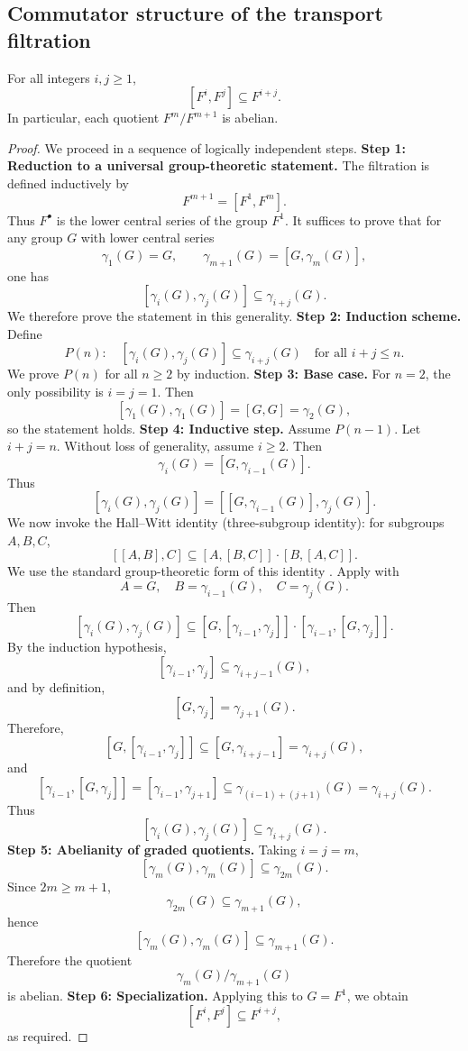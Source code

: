 \subsection*{Commutator structure of the transport filtration}
\begin{lemma}
	\label{lem:fusion-commutator}
	For all integers \(i,j\ge 1\),
	\[
		[F^i,F^j]\subseteq F^{i+j}.
	\]
	In particular, each quotient \(F^m/F^{m+1}\) is abelian.
\end{lemma}
\begin{proof}
	We proceed in a sequence of logically independent steps.
	\medskip
	\noindent
	\textbf{Step 1: Reduction to a universal group-theoretic statement.}
	The filtration is defined inductively by
	\[
		F^{m+1}=[F^1,F^m].
	\]
	Thus \(F^\bullet\) is the lower central series of the group \(F^1\).
	It suffices to prove that for any group \(G\) with lower central series
	\[
		\gamma_1(G)=G,\qquad \gamma_{m+1}(G)=[G,\gamma_m(G)],
	\]
	one has
	\[
		[\gamma_i(G),\gamma_j(G)]\subseteq \gamma_{i+j}(G).
	\]
	We therefore prove the statement in this generality.
	\medskip
	\noindent
	\textbf{Step 2: Induction scheme.}
	Define
	\[
		P(n):\quad
		[\gamma_i(G),\gamma_j(G)]\subseteq \gamma_{i+j}(G)
		\quad\text{for all }i+j\le n.
	\]
	We prove \(P(n)\) for all \(n\ge2\) by induction.
	\medskip
	\noindent
	\textbf{Step 3: Base case.}
	For \(n=2\), the only possibility is \(i=j=1\).
	Then
	\[
		[\gamma_1(G),\gamma_1(G)]
		=
		[G,G]
		=
		\gamma_2(G),
	\]
	so the statement holds.
	\medskip
	\noindent
	\textbf{Step 4: Inductive step.}
	Assume \(P(n-1)\).
	Let \(i+j=n\).
	Without loss of generality, assume \(i\ge2\).
	Then
	\[
		\gamma_i(G)=[G,\gamma_{i-1}(G)].
	\]
	Thus
	\[
		[\gamma_i(G),\gamma_j(G)]
		=
		[[G,\gamma_{i-1}(G)],\gamma_j(G)].
	\]
	We now invoke the Hall--Witt identity (three-subgroup identity):
	for subgroups \(A,B,C\),
	\[
		[[A,B],C]\subseteq [A,[B,C]]\cdot [B,[A,C]].
	\]
	We use the standard group-theoretic form of this identity
	\cite{Hall1959}.
	Apply with
	\[
		A=G,\quad B=\gamma_{i-1}(G),\quad C=\gamma_j(G).
	\]
	Then
	\[
		[\gamma_i(G),\gamma_j(G)]
		\subseteq
		[G,[\gamma_{i-1},\gamma_j]]
		\cdot
		[\gamma_{i-1},[G,\gamma_j]].
	\]
	By the induction hypothesis,
	\[
		[\gamma_{i-1},\gamma_j]\subseteq \gamma_{i+j-1}(G),
	\]
	and by definition,
	\[
		[G,\gamma_j]=\gamma_{j+1}(G).
	\]
	Therefore,
	\[
		[G,[\gamma_{i-1},\gamma_j]]
		\subseteq
		[G,\gamma_{i+j-1}]
		=
		\gamma_{i+j}(G),
	\]
	and
	\[
		[\gamma_{i-1},[G,\gamma_j]]
		=
		[\gamma_{i-1},\gamma_{j+1}]
		\subseteq
		\gamma_{(i-1)+(j+1)}(G)
		=
		\gamma_{i+j}(G).
	\]
	Thus
	\[
		[\gamma_i(G),\gamma_j(G)]
		\subseteq
		\gamma_{i+j}(G).
	\]
	\medskip
	\noindent
	\textbf{Step 5: Abelianity of graded quotients.}
	Taking \(i=j=m\),
	\[
		[\gamma_m(G),\gamma_m(G)]\subseteq \gamma_{2m}(G).
	\]
	Since \(2m\ge m+1\),
	\[
		\gamma_{2m}(G)\subseteq \gamma_{m+1}(G),
	\]
	hence
	\[
		[\gamma_m(G),\gamma_m(G)]\subseteq \gamma_{m+1}(G).
	\]
	Therefore the quotient
	\[
		\gamma_m(G)/\gamma_{m+1}(G)
	\]
	is abelian.
	\medskip
	\noindent
	\textbf{Step 6: Specialization.}
	Applying this to \(G=F^1\), we obtain
	\[
		[F^i,F^j]\subseteq F^{i+j},
	\]
	as required.
\end{proof}
